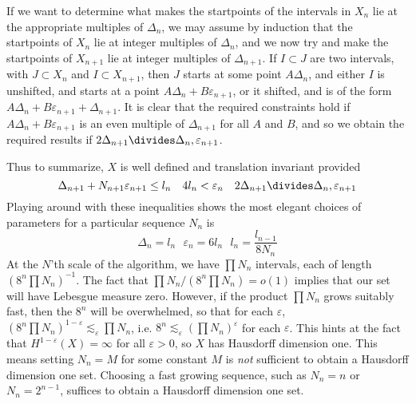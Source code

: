 \documentclass{report}
\theoremstyle{plain}
\theoremstyle{plain}
\begin{document}
If we want to determine what makes the startpoints of the intervals in $X_n$ lie at the appropriate multiples of $\Delta_n$, we may assume by induction that the startpoints of $X_n$ lie at integer multiples of $\Delta_n$, and we now try and make the startpoints of $X_{n+1}$ lie at integer multiples of $\Delta_{n+1}$. If $I \subset J$ are two intervals, with $J \subset X_n$ and $I \subset X_{n+1}$, then $J$ starts at some point $A \Delta_n$, and either $I$ is unshifted, and starts at a point $A \Delta_n + B \varepsilon_{n+1}$, or it shifted, and is of the form $A \Delta_n + B \varepsilon_{n+1} + \Delta_{n+1}$. It is clear that the required constraints hold if $A \Delta_n + B \varepsilon_{n+1}$ is an even multiple of $\Delta_{n+1}$ for all $A$ and $B$, and so we obtain the required results if $2 \Delta_{n+1} \divides \Delta_n, \varepsilon_{n+1}$. 

Thus to summarize, $X$ is well defined and translation invariant provided
%
\[ \Delta_{n+1} + N_{n+1}\varepsilon_{n+1} \leq l_n\ \ \ 4l_n < \varepsilon_n\ \ \ 2\Delta_{n+1} \divides \Delta_n, \varepsilon_{n+1} \]
%
Playing around with these inequalities shows the most elegant choices of parameters for a particular sequence $N_n$ is
%
\[ \Delta_n = l_n\ \ \ \varepsilon_n = 6l_n\ \ \ l_n = \frac{l_{n-1}}{8N_n} \]
%
At the $N$'th scale of the algorithm, we have $\prod N_n$ intervals, each of length $(8^n \prod N_n)^{-1}$. The fact that $\prod N_n / (8^n \prod N_n) = o(1)$ implies that our set will have Lebesgue measure zero. However, if the product $\prod N_n$ grows suitably fast, then the $8^n$ will be overwhelmed, so that for each $\varepsilon$, $(8^n \prod N_n)^{1-\varepsilon} \lesssim_\varepsilon \prod N_n$, i.e. $8^n \lesssim_\varepsilon (\prod N_n)^\varepsilon$ for each $\varepsilon$. This hints at the fact that $H^{1-\varepsilon}(X) = \infty$ for all $\varepsilon > 0$, so $X$ has Hausdorff dimension one. This means setting $N_n = M$ for some constant $M$ is {\it not} sufficient to obtain a Hausdorff dimension one set. Choosing a fast growing sequence, such as $N_n = n$ or $N_n = 2^{n-1}$, suffices to obtain a Hausdorff dimension one set.
\end{document}

